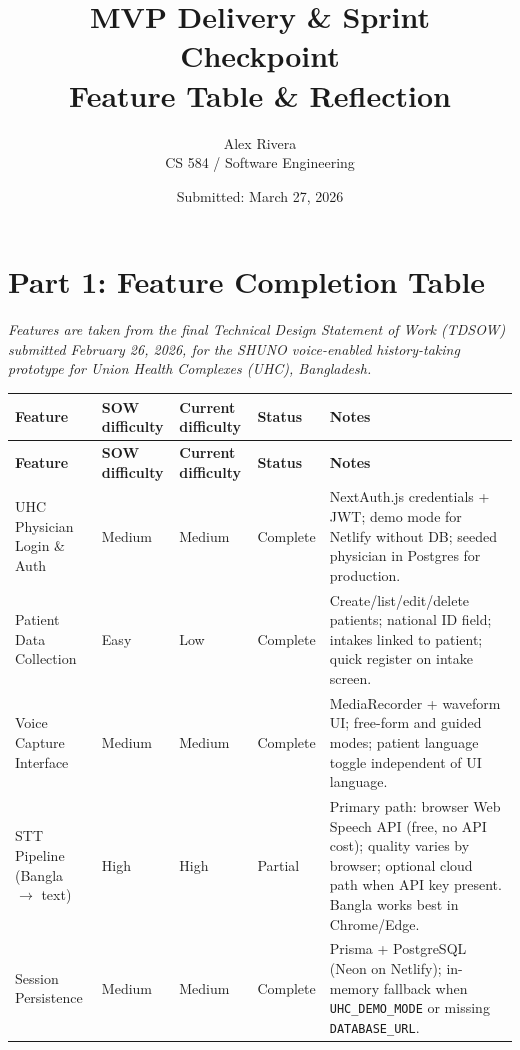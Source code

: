 \documentclass[11pt]{article}
\title{MVP Delivery \& Sprint Checkpoint\\Feature Table \& Reflection}
\author{Alex Rivera\\CS 584 / Software Engineering}
\date{Submitted: March 27, 2026}
\begin{document}
\maketitle

\section*{Part 1: Feature Completion Table}

\noindent\textit{Features are taken from the final Technical Design Statement of Work (TDSOW) submitted February 26, 2026, for the SHUNO voice-enabled history-taking prototype for Union Health Complexes (UHC), Bangladesh.}

\vspace{0.5em}

\begin{longtable}{@{}>{\raggedright\arraybackslash}p{3.4cm}>{\centering\arraybackslash}p{1.9cm}>{\centering\arraybackslash}p{2.0cm}>{\centering\arraybackslash}p{2.0cm}>{\raggedright\arraybackslash}p{4.7cm}@{}}
\toprule
\textbf{Feature} &
\textbf{SOW difficulty} &
\textbf{Current difficulty} &
\textbf{Status} &
\textbf{Notes} \\
\midrule
\endfirsthead
\toprule
\textbf{Feature} &
\textbf{SOW difficulty} &
\textbf{Current difficulty} &
\textbf{Status} &
\textbf{Notes} \\
\midrule
\endhead
\bottomrule
\endlastfoot

UHC Physician Login \& Auth
  & Medium & Medium & Complete
  & NextAuth.js credentials + JWT; demo mode for Netlify without DB; seeded physician in Postgres for production. \\

Patient Data Collection
  & Easy & Low & Complete
  & Create/list/edit/delete patients; national ID field; intakes linked to patient; quick register on intake screen. \\

Voice Capture Interface
  & Medium & Medium & Complete
  & MediaRecorder + waveform UI; free-form and guided modes; patient language toggle independent of UI language. \\

STT Pipeline (Bangla $\rightarrow$ text)
  & High & High & Partial
  & Primary path: browser Web Speech API (free, no API cost); quality varies by browser; optional cloud path when API key present. Bangla works best in Chrome/Edge. \\

Session Persistence
  & Medium & Medium & Complete
  & Prisma + PostgreSQL (Neon on Netlify); in-memory fallback when \texttt{UHC\_DEMO\_MODE} or missing \texttt{DATABASE\_URL}. \\


\end{longtable}
\end{document}
